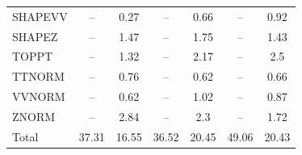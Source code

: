 \begin{table}[H]
\begin{center}
\begin{footnotesize}
\begin{tabular}{lcccccc}
				SHAPEVV & -- &  0.27 & -- &  0.66 & -- &  0.92 \\
				SHAPEZ & -- &  1.47 & -- &  1.75 & -- &  1.43 \\
				TOPPT & -- &  1.32 & -- &  2.17 & -- &  2.5 \\
				TTNORM & -- &  0.76 & -- &  0.62 & -- &  0.66 \\
				VVNORM & -- &  0.62 & -- &  1.02 & -- &  0.87 \\
				ZNORM & -- &  2.84 & -- &  2.3 & -- &  1.72 \\
				Total &  37.31  &  16.55 &  36.52  &  20.45 &  49.06  &  20.43 \\ \hline \hline
			\end{tabular}
			\label{tab:SysUncertainties_1800}
        \end{footnotesize}
	\end{center}
\end{table}


